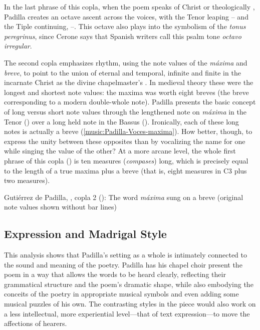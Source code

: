 In the last phrase of this copla, when the poem speaks of Christ  or theologically , Padilla
creates an octave ascent across the voices, with the Tenor leaping
-- and the Tiple continuing, --.
This octave also plays into the symbolism of the \emph{tonus peregrinus}, since
Cerone says that Spanish writers call this  psalm tone
\emph{octavo irregular}.%
    \Autocite[354]{Cerone:Melopeo}

The second copla emphasizes rhythm, using the note values of the \emph{máxima}
and \emph{breve}, to point to the union of eternal and temporal, infinite and
finite in the incarnate Christ as the divine chapelmaster's
.
In medieval theory these were the longest and shortest note values: the maxima
was worth eight breves (the breve corresponding to a modern double-whole note).
Padilla presents the basic concept of long versus short note values through the
lengthened note on \emph{máxima} in the Tenor () over a long
held note in the Bassus ().
Ironically, each of these long notes is actually a breve
(\cref{music:Padilla-Voces-maxima}).
How better, though, to express the unity between these opposites than by
vocalizing the name for one while singing the value of the other?
At a more arcane level, the whole first phrase of this copla
() is ten measures (\emph{compases}) long, which is precisely
equal to the length of a true maxima plus a breve (that is, eight measures in C3
plus two measures).

\begin{musicexample}
    \caption{Gutiérrez de Padilla, , copla 2
    (): The word \emph{máxima} sung on a breve (original note
    values shown without bar lines)}
  
    \label{music:Padilla-Voces-maxima}

\end{musicexample}


\subsection{Expression and Madrigal Style}

This analysis shows that Padilla's setting as a whole is intimately connected to
the sound and meaning of the poetry.
Padilla has his chapel choir present the poem in a way that allows the words to
be heard clearly, reflecting their grammatical structure and the poem's dramatic
shape, while also embodying the conceits of the poetry in appropriate musical
symbols and even adding some musical puzzles of his own.
The contrasting styles in the piece would also work on a less intellectual, more
experiential level---that of text expression---to move the affections of
hearers.

